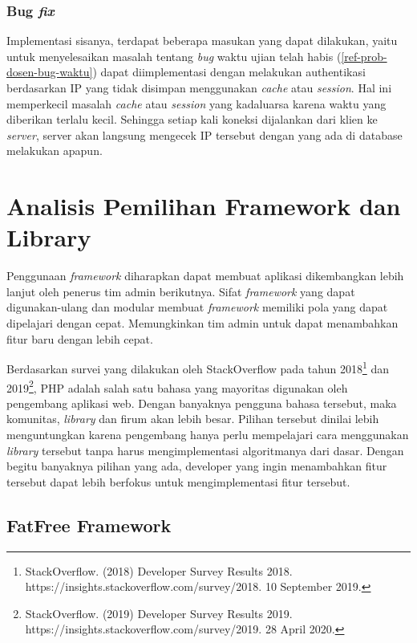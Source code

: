     \subsubsection{Bug \textit{fix}} Implementasi sisanya, terdapat beberapa
        masukan yang dapat dilakukan, yaitu untuk menyelesaikan masalah tentang
        \textit{bug} waktu ujian telah habis (\ref{ref-prob-dosen-bug-waktu})
        dapat diimplementasi dengan melakukan authentikasi berdasarkan IP yang
        tidak disimpan menggunakan \textit{cache} atau \textit{session}. Hal ini
        memperkecil masalah \textit{cache} atau \textit{session} yang kadaluarsa
        karena waktu yang diberikan terlalu kecil. Sehingga setiap kali koneksi
        dijalankan dari klien ke \textit{server}, server akan langsung mengecek
        IP tersebut dengan yang ada di database melakukan apapun.

\section{Analisis Pemilihan Framework dan Library}
    Penggunaan \textit{framework} diharapkan dapat membuat aplikasi dikembangkan
    lebih lanjut oleh penerus tim admin berikutnya. Sifat \textit{framework} yang
    dapat digunakan-ulang dan modular membuat \textit{framework} memiliki pola yang
    dapat dipelajari dengan cepat. Memungkinkan tim admin untuk dapat menambahkan
    fitur baru dengan lebih cepat. 
    
    Berdasarkan survei yang dilakukan oleh StackOverflow pada tahun
    2018\footnote{StackOverflow. (2018) Developer Survey Results 2018.
    https://insights.stackoverflow.com/survey/2018. 10 September 2019.} dan
    2019\footnote{StackOverflow. (2019) Developer Survey Results 2019.
    https://insights.stackoverflow.com/survey/2019. 28 April 2020.}, PHP adalah salah satu bahasa yang
    mayoritas digunakan oleh pengembang aplikasi web. Dengan banyaknya pengguna
    bahasa tersebut, maka komunitas, \textit{library} dan firum akan lebih besar.
    Pilihan tersebut dinilai lebih menguntungkan karena pengembang hanya perlu
    mempelajari cara menggunakan \textit{library} tersebut tanpa harus
    mengimplementasi algoritmanya dari dasar. Dengan begitu banyaknya pilihan yang
    ada, developer yang ingin menambahkan fitur tersebut dapat lebih berfokus untuk
    mengimplementasi fitur tersebut.

\subsection{FatFree Framework}

